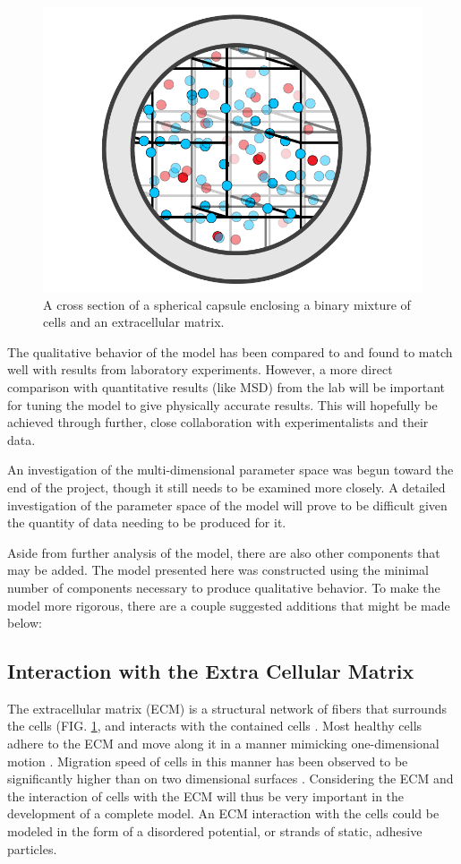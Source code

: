 \documentclass[aps,prb,twocolumn,groupedaddress,nofootinbib,floatfix]{revtex4}
\begin{document}
\begin{figure}
  \includegraphics[width=0.9\columnwidth]{images/Fig2.png}
  \caption[capsuleECM]
   {A cross section of a spherical capsule enclosing a binary mixture of cells and an extracellular matrix.}
   \label{fig:capsuleECM}
\end{figure}

The qualitative behavior of the model has been compared to and found to match well with results from laboratory experiments.
However, a more direct comparison with quantitative results (like MSD) from the lab will be important for tuning the model to give physically accurate results.
This will hopefully be achieved through further, close collaboration with experimentalists and their data.

An investigation of the multi-dimensional parameter space was begun toward the end of the project, though it still needs to be examined more closely.
A detailed investigation of the parameter space of the model will prove to be difficult given the quantity of data needing to be produced for it.

Aside from further analysis of the model, there are also other components that may be added.
The model presented here was constructed using the minimal number of components necessary to produce qualitative behavior.
To make the model more rigorous, there are a couple suggested additions that might be made below:

\subsection{Interaction with the Extra Cellular Matrix}
The extracellular matrix (ECM) is a structural network of fibers that surrounds the cells (FIG. \ref{fig:capsuleECM}, and interacts with the contained cells \cite{Alberts}.
Most healthy cells adhere to the ECM and move along it in a manner mimicking one-dimensional motion \cite{Cukierman}.
Migration speed of cells in this manner has been observed to be significantly higher than on two dimensional surfaces \cite{Doyle}.
Considering the ECM and the interaction of cells with the ECM will thus be very important in the development of a complete model.
An ECM interaction with the cells could be modeled in the form of a disordered potential, or strands of static, adhesive particles.
\end{document}
